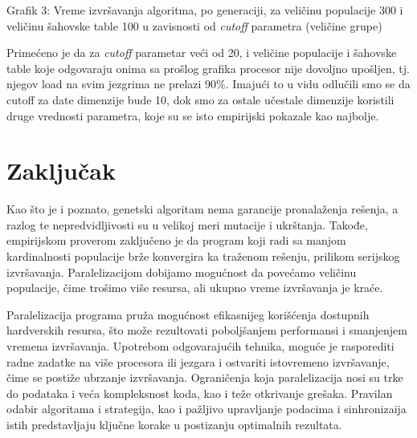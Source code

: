 \documentclass[12pt, a4paper]{article}
\begin{document}
	\begin{center}
	\end{center}
	\begin{center}
		Grafik 3: Vreme izvršavanja algoritma, po generaciji, za veličinu populacije 300 i veličinu šahovske table 100 u zavisnosti od \textit{cutoff} parametra (veličine grupe) \\
	\end{center}

	Primećeno je da za \textit{cutoff} parametar veći od 20, i veličine populacije i šahovske table koje odgovaraju onima sa prošlog grafika procesor nije dovoljno upošljen, tj. njegov load na svim jezgrima ne prelazi 90\%. Imajući to u vidu odlučili smo se da cutoff za date dimenzije bude 10, dok smo za ostale učestale dimenzije koristili druge vrednosti parametra, koje su se isto empirijski pokazale kao najbolje.
	
	\newpage
	
	\section{Zaključak}
	Kao što je i poznato, genetski algoritam nema garancije pronalaženja rešenja, a razlog te nepredvidljivosti su u velikoj meri mutacije i ukrštanja. Takođe, empirijskom proverom zaključeno je da program koji radi sa manjom kardinalnosti populacije brže konvergira ka traženom rešenju, prilikom serijskog izvršavanja. Paralelizacijom dobijamo mogućnost da povećamo veličinu populacije, čime trošimo više resursa, ali ukupno vreme izvršavanja je kraće.
	
	Paralelizacija programa pruža mogućnost efikasnijeg korišćenja dostupnih hardverskih resursa, što može rezultovati poboljšanjem performansi i smanjenjem vremena izvršavanja. Upotrebom odgovarajućih tehnika, moguće je rasporediti radne zadatke na više procesora ili jezgara i ostvariti istovremeno izvršavanje, čime se postiže ubrzanje izvršavanja. Ograničenja koja paralelizacija nosi su trke do podataka i veća kompleksnost koda, kao i teže otkrivanje grešaka. Pravilan odabir algoritama i strategija, kao i pažljivo upravljanje podacima i sinhronizaija istih predstavljaju ključne korake u postizanju optimalnih rezultata.
	
\end{document}
